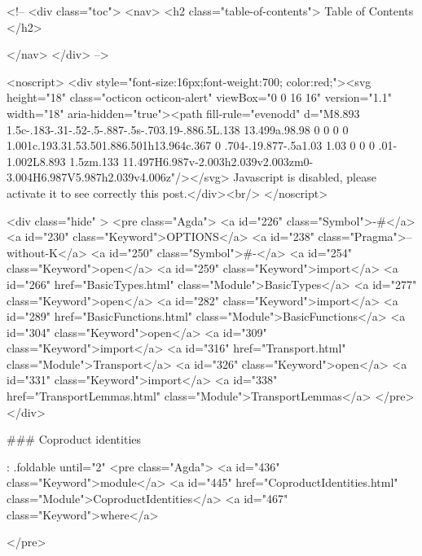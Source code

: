   <!-- 
  <div class="toc">
    <nav>
    <h2 class="table-of-contents"> Table of Contents </h2>
      

    </nav>
  </div>
   -->

  <noscript>
  <div style="font-size:16px;font-weight:700; color:red;"><svg height="18" class="octicon octicon-alert" viewBox="0 0 16 16" version="1.1" width="18" aria-hidden="true"><path fill-rule="evenodd" d="M8.893 1.5c-.183-.31-.52-.5-.887-.5s-.703.19-.886.5L.138 13.499a.98.98 0 0 0 0 1.001c.193.31.53.501.886.501h13.964c.367 0 .704-.19.877-.5a1.03 1.03 0 0 0 .01-1.002L8.893 1.5zm.133 11.497H6.987v-2.003h2.039v2.003zm0-3.004H6.987V5.987h2.039v4.006z"/></svg> Javascript is disabled, please activate it to see correctly this post.</div><br/>
  </noscript>

  <div class="hide" >
<pre class="Agda">
<a id="226" class="Symbol">{-#</a> <a id="230" class="Keyword">OPTIONS</a> <a id="238" class="Pragma">--without-K</a> <a id="250" class="Symbol">#-}</a>
<a id="254" class="Keyword">open</a> <a id="259" class="Keyword">import</a> <a id="266" href="BasicTypes.html" class="Module">BasicTypes</a>
<a id="277" class="Keyword">open</a> <a id="282" class="Keyword">import</a> <a id="289" href="BasicFunctions.html" class="Module">BasicFunctions</a>
<a id="304" class="Keyword">open</a> <a id="309" class="Keyword">import</a> <a id="316" href="Transport.html" class="Module">Transport</a>
<a id="326" class="Keyword">open</a> <a id="331" class="Keyword">import</a> <a id="338" href="TransportLemmas.html" class="Module">TransportLemmas</a>
</pre>
</div>

### Coproduct identities

{: .foldable until="2"}
<pre class="Agda">
<a id="436" class="Keyword">module</a>
  <a id="445" href="CoproductIdentities.html" class="Module">CoproductIdentities</a>
  <a id="467" class="Keyword">where</a>

</pre>

